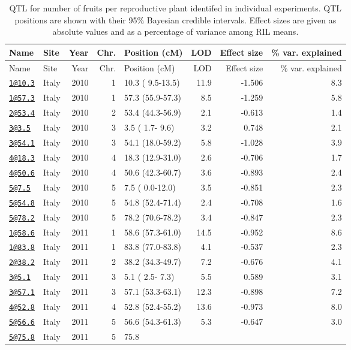\documentclass[]{article}
\begin{document}
\begin{longtable}[]{@{}llrrlrrr@{}}
\caption{QTL for number of fruits per reproductive plant identifed in
individual experiments. QTL positions are shown with their 95\% Bayesian
credible intervals. Effect sizes are given as absolute values and as a
percentage of variance among RIL means.}\tabularnewline
\toprule
Name & Site & Year & Chr. & Position (cM) & LOD & Effect size & \% var.
explained\tabularnewline
\midrule
\endfirsthead
\toprule
Name & Site & Year & Chr. & Position (cM) & LOD & Effect size & \% var.
explained\tabularnewline
\midrule
\endhead
\href{mailto:1@10.3}{\nolinkurl{1@10.3}} & Italy & 2010 & 1 & 10.3 (
9.5-13.5) & 11.9 & -1.506 & 8.3\tabularnewline
\href{mailto:1@57.3}{\nolinkurl{1@57.3}} & Italy & 2010 & 1 & 57.3
(55.9-57.3) & 8.5 & -1.259 & 5.8\tabularnewline
\href{mailto:2@53.4}{\nolinkurl{2@53.4}} & Italy & 2010 & 2 & 53.4
(44.3-56.9) & 2.1 & -0.613 & 1.4\tabularnewline
\href{mailto:3@3.5}{\nolinkurl{3@3.5}} & Italy & 2010 & 3 & 3.5 ( 1.7-
9.6) & 3.2 & 0.748 & 2.1\tabularnewline
\href{mailto:3@54.1}{\nolinkurl{3@54.1}} & Italy & 2010 & 3 & 54.1
(18.0-59.2) & 5.8 & -1.028 & 3.9\tabularnewline
\href{mailto:4@18.3}{\nolinkurl{4@18.3}} & Italy & 2010 & 4 & 18.3
(12.9-31.0) & 2.6 & -0.706 & 1.7\tabularnewline
\href{mailto:4@50.6}{\nolinkurl{4@50.6}} & Italy & 2010 & 4 & 50.6
(42.3-60.7) & 3.6 & -0.893 & 2.4\tabularnewline
\href{mailto:5@7.5}{\nolinkurl{5@7.5}} & Italy & 2010 & 5 & 7.5 (
0.0-12.0) & 3.5 & -0.851 & 2.3\tabularnewline
\href{mailto:5@54.8}{\nolinkurl{5@54.8}} & Italy & 2010 & 5 & 54.8
(52.4-71.4) & 2.4 & -0.708 & 1.6\tabularnewline
\href{mailto:5@78.2}{\nolinkurl{5@78.2}} & Italy & 2010 & 5 & 78.2
(70.6-78.2) & 3.4 & -0.847 & 2.3\tabularnewline
\href{mailto:1@58.6}{\nolinkurl{1@58.6}} & Italy & 2011 & 1 & 58.6
(57.3-61.0) & 14.5 & -0.952 & 8.6\tabularnewline
\href{mailto:1@83.8}{\nolinkurl{1@83.8}} & Italy & 2011 & 1 & 83.8
(77.0-83.8) & 4.1 & -0.537 & 2.3\tabularnewline
\href{mailto:2@38.2}{\nolinkurl{2@38.2}} & Italy & 2011 & 2 & 38.2
(34.3-49.7) & 7.2 & -0.676 & 4.1\tabularnewline
\href{mailto:3@5.1}{\nolinkurl{3@5.1}} & Italy & 2011 & 3 & 5.1 ( 2.5-
7.3) & 5.5 & 0.589 & 3.1\tabularnewline
\href{mailto:3@57.1}{\nolinkurl{3@57.1}} & Italy & 2011 & 3 & 57.1
(53.3-63.1) & 12.3 & -0.898 & 7.2\tabularnewline
\href{mailto:4@52.8}{\nolinkurl{4@52.8}} & Italy & 2011 & 4 & 52.8
(52.4-55.2) & 13.6 & -0.973 & 8.0\tabularnewline
\href{mailto:5@56.6}{\nolinkurl{5@56.6}} & Italy & 2011 & 5 & 56.6
(54.3-61.3) & 5.3 & -0.647 & 3.0\tabularnewline
\href{mailto:5@75.8}{\nolinkurl{5@75.8}} & Italy & 2011 & 5 & 75.8

\end{longtable}
\end{document}
